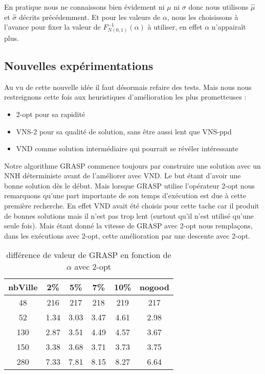 \documentclass[12pt,a4paper]{article}
\begin{document}
En pratique nous ne connaissons bien évidement ni $\mu$ ni $\sigma$ donc nous utilisons $\widehat{\mu}$ et $\widehat{\sigma}$ décrits précédemment. Et pour les valeurs de $\alpha$, nous les choisissons à l'avance pour fixer la valeur de $F^{-1} _{N(0,1)} ( \alpha)$ à utiliser, en effet $\alpha$ n’appairaît plus.\\

\subsection{Nouvelles expérimentations}

Au vu de cette nouvelle idée il faut désormais refaire des tests. Mais nous nous restreignons cette fois aux heuristiques d'amélioration les plus prometteuses :
\begin{itemize}
\item
2-opt pour sa rapidité
\item
VNS-2 pour sa qualité de solution, sans être aussi lent que VNS-ppd
\item
VND comme solution intermédiaire qui pourrait se révéler intéressante
\end{itemize}

Notre algorithme GRASP commence toujours par construire une solution avec un NNH déterministe avant de l’améliorer avec VND. Le but étant d'avoir une bonne solution dès le début. Mais lorsque GRASP utilise l’opérateur 2-opt nous remarquons qu'une part importante de son temps d’exécution est due à cette première recherche. En effet VND avait été choisis pour cette tache car il produit de bonnes solutions mais il n'est pas trop lent (surtout qu'il n'est utilisé qu'une seule fois). Mais étant donné la vitesse de GRASP avec 2-opt nous remplaçons, dans les exécutions avec 2-opt, cette amélioration par une descente avec 2-opt.

\begin{table}[!h]
\centering
\begin{tabular}{|*{6}{c|}}
  \hline
  nbVille & 2\% & 5\% & 7\% & 10\% & nogood \\
  \hline
  48 & 216 & 217 & 218 & 219 & 217 \\
  52 & 1.34 & 3.03 & 3.47 & 4.61 & 2.98 \\
  130 & 2.87 & 3.51 & 4.49 & 4.57 & 3.67 \\
  150 & 3.38 & 3.68 & 3.71 & 3.73 & 3.75 \\
  280 & 7.33 & 7.81 & 8.15 & 8.27 & 6.64 \\
  \hline
\end{tabular}
\caption{différence de valeur de GRASP en fonction de $\alpha$ avec 2-opt}
\label{recherchelocaleGRASPval2optproba}
\end{table}
\end{document}

